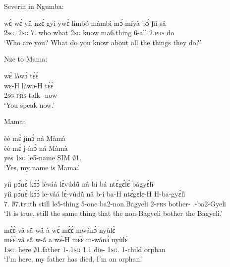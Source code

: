 \noindent Severin in Ngumba:

\begin{exe}[(C234)]  
\exC\label{163}
  \gll wɛ̀ wɛ́ yíì nzɛ́ gyí ywɛ̀ límbó màmbì mɔ́-míyà bɔ́ ʃíí sâ \\
         2\textsc{sg}.{\SBJ} 2\textsc{sg} 7.{\COP} who what 2\textsc{sg} know ma6.thing 6-all 2.\textsc{prs} {\PROG} do  \\
    \trans `Who are you? What do you know about all the things they do?'
\end{exe}

\noindent Nze to Mama:

\begin{exe}[(C234)]  
\exC\label{164} 
  \glll wɛ́ làwɔ́ tɛ́ɛ̀\\
       wɛ-H làwɔ-H tɛ́ɛ̀ \\
         2\textsc{sg}-\textsc{prs} talk-{\R} now   \\
    \trans `You speak now.'
\end{exe}

\noindent Mama:

\begin{exe}[(C234)]  
\exC\label{165} 
  \glll èè mɛ̀ jínɔ̀ ná Màmà \\
         èè mɛ̀ j-ínɔ̀ ná Màmà \\
       yes 1\textsc{sg} le5-name SIM $\emptyset$1.{\PN}  \\
    \trans `Yes, my name is Mama.'
 
\exC\label{166} 
  \glll yíì pɔ́nɛ́ kɔ́ɔ̀ lèváá lɛ̀vúdũ̂ nâ bí bá ntɛ́gɛ́lɛ́ bágyɛ̀lì \\
       yíì pɔ́nɛ́ kɔ́ɔ̀ le-váá lɛ̀-vúdũ̂ nâ b-í ba-H ntɛ́gɛlɛ-H H-ba-gyɛ̀lì \\
 7.{\COP} $\emptyset$7.truth still le5-thing 5-one {\COMP} ba2-non.Bagyeli 2-\textsc{prs} bother-{\R} {\OBJ}.{\LINK}-ba2-Gyeli \\
    \trans `It is true, still the same thing that the non-Bagyeli bother the Bagyeli.'
 
\exC\label{167} 
  \glll  mɛ̀ɛ̀ vâ sã̂ wã́ à wɛ́ mɛ̀ɛ̀ mwánɔ̀ nyùlɛ̀\\
        mɛ̀ɛ̀ vâ sã̂ w-ã́ a wɛ̀-H mɛ̀ɛ̀ m-wánɔ̀ nyùlɛ̀\\
          1\textsc{sg}.{\COP} here $\emptyset$1.father 1-{\POSS}.1\textsc{sg} 1.{\PST}1 die-{\R} 1\textsc{sg}.{\COP} {\N}1-child orphan\\
    \trans `I'm here, my father has died, I'm an orphan.'
\end{exe}

